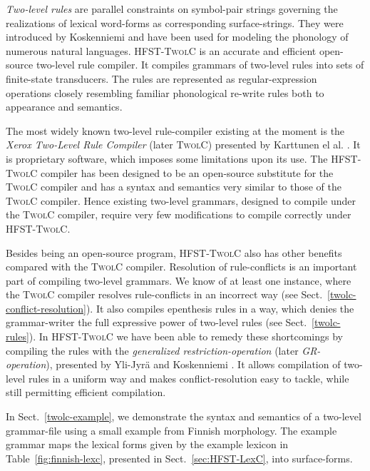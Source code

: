\documentclass[postprint]{flammie}
\begin{document}
\textit{Two-level rules} are parallel constraints on symbol-pair
strings governing the realizations of lexical word-forms as
corresponding surface-strings. They were introduced by Koskenniemi
\cite{Koskenniemi83} and have been used for modeling the phonology of
numerous natural languages. \textsc{HFST-TwolC} is an accurate and
efficient open-source two-level rule compiler. It compiles grammars of
two-level rules into sets of finite-state transducers. The rules are
represented as regular-expression operations closely resembling
familiar phonological re-write rules both to appearance and semantics.

The most widely known two-level rule-compiler existing at the moment
is the \emph{Xerox Two-Level Rule Compiler} (later \textsc{TwolC})
presented by Karttunen el al. \cite{Karttunen92}.  It is proprietary
software, which imposes some limitations upon its use. The
\textsc{HFST-TwolC} compiler has been designed to be an open-source
substitute for the \textsc{TwolC} compiler and has a syntax and
semantics very similar to those of the \textsc{TwolC} compiler. Hence
existing two-level grammars, designed to compile under the
\textsc{TwolC} compiler, require very few modifications to compile
correctly under \textsc{HFST-TwolC}.

Besides being an open-source program, \textsc{HFST-TwolC} also has
other benefits compared with the \textsc{TwolC} compiler. Resolution
of rule-conflicts is an important part of compiling two-level
grammars. We know of at least one instance, where the \textsc{TwolC}
compiler resolves rule-conflicts in an incorrect way (see
Sect.~\ref{twolc-conflict-resolution}). It also compiles epenthesis
rules in a way, which denies the grammar-writer the full expressive
power of two-level rules (see Sect.~\ref{twolc-rules}). In
\textsc{HFST-TwolC} we have been able to remedy these shortcomings by
compiling the rules with the \textit{generalized
restriction-operation} (later \textit{GR-operation}), presented by
Yli-Jyr\"a and Koskenniemi \cite{Yli-Jyra06}. It allows compilation of
two-level rules in a uniform way and makes conflict-resolution easy to
tackle, while still permitting efficient compilation.

In Sect.~\ref{twolc-example}, we demonstrate the syntax and semantics
of a two-level grammar-file using a small example from Finnish
morphology. The example grammar maps the lexical forms given by the
example lexicon in Table~\ref{fig:finnish-lexc}, presented in
Sect.~\ref{sec:HFST-LexC}, into surface-forms.
\end{document}

